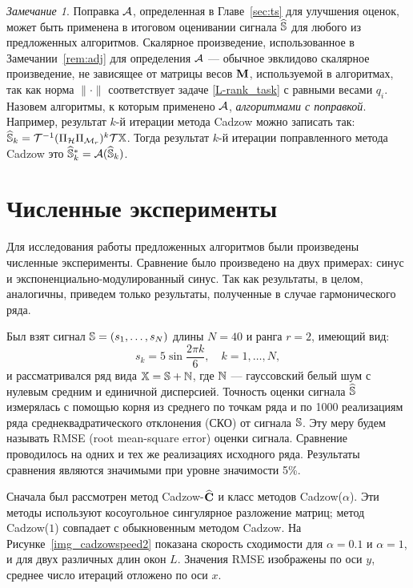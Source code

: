 \documentclass[12pt, specialist, subf,href,colorlinks=true,substylefile = spbu.rtx]{disser}
\theoremstyle{remark}
\newtheorem{remark}{Замечание}
\theoremstyle{definition}
\begin{document}
	\begin{remark}
		\label{rem:adjust}
		 Поправка $\mathcal{A}$, определенная в Главе~\ref{sec:ts} для улучшения оценок, может быть применена в итоговом оценивании сигнала $\widehat{\mathbb{S}}$ для любого из предложенных алгоритмов. Скалярное произведение, использованное в Замечании~\ref{rem:adj} для определения $\mathcal{A}$ --- обычное эвклидово скалярное произведение, не зависящее от матрицы весов $\mathbf{M}$, используемой в алгоритмах, так как норма $\|\cdot\|$ соответствует задаче \eqref{L-rank_task} с равными весами $q_i$. Назовем алгоритмы, к которым применено $\mathcal{A}$, \emph{алгоритмами с поправкой}. Например, результат $k$-й итерации метода Cadzow можно записать так: $\widehat{\mathbb{S}}_k = \mathcal{T}^{-1}(\Pi_{\mathcal{H}} \Pi_{\mathcal{M}_r})^k \mathcal{T} \mathbb{X}$. Тогда результат $k$-й итерации поправленного метода Cadzow это $\widehat{\mathbb{S}}_k^*=\mathcal{A}(\widehat{\mathbb{S}}_k)$.
	\end{remark}

\chapter{Численные эксперименты}
\label{sec:simul}
Для исследования работы предложенных алгоритмов были произведены численные эксперименты. Сравнение было произведено на двух примерах: синус и экспоненциально-модулированный синус. Так как результаты, в целом, аналогичны, приведем только результаты, полученные в случае гармонического ряда.

Был взят сигнал $\mathbb{S} = (s_{1}, \ldots, s_N)$ длины $N = 40$ и ранга $r=2$, имеющий вид:
\begin{equation}
\label{eq:signal}
s_{k} = 5\sin{\frac{2 \pi k}{6}}, \quad k = 1, \ldots, N,
\end{equation}
и рассматривался ряд вида $\mathbb{X} = \mathbb{S} + \mathbb{N}$, где $\mathbb{N}$ --- гауссовский белый шум с нулевым средним и единичной дисперсией. Точность оценки сигнала $\widehat{\mathbb{S}}$ измерялась с помощью корня из среднего по точкам ряда и по 1000 реализациям ряда среднеквадратического отклонения (СКО) от сигнала $\mathbb{S}$. Эту меру будем называть RMSE (root mean-square error) оценки сигнала. Сравнение проводилось на одних и тех же реализациях исходного ряда. Результаты сравнения являются значимыми при уровне значимости 5\%.

Сначала был рассмотрен метод Cadzow-$\widehat{\mathbf{C}}$ и класс методов Cadzow($\alpha$). Эти методы используют косоугольное сингулярное разложение матриц; метод Cadzow($1$) совпадает с обыкновенным методом Cadzow. На Рисунке~\ref{img_cadzowspeed2} показана скорость сходимости для $\alpha = 0.1$ и $\alpha = 1$, и для двух различных длин окон $L$. Значения RMSE изображены по оси $y$, среднее число итераций отложено по оси $x$.
\end{document}
